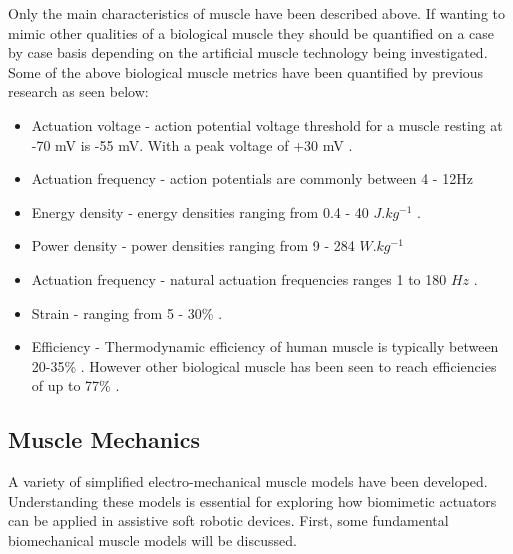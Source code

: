 Only the main characteristics of muscle have been described above. If wanting to mimic other qualities of a biological muscle they should be quantified on a case by case basis depending on the artificial muscle technology being investigated. Some of the above biological muscle metrics have been quantified by previous research as seen below:
\begin{itemize}
	\item Actuation voltage - action potential voltage threshold for a muscle resting at -70 mV is -55 mV. With a peak voltage of +30 mV \cite{Filatov2005,Schmidt-Nielsen2002}.
	\item Actuation frequency - action potentials are commonly between 4 - 12Hz \citep{Popovic2004}
    \item Energy density - energy densities ranging from 0.4 - 40 $J.kg^{-1}$ \citep{Alexander1977}.
    \item Power density - power densities ranging from 9 - 284 $W.kg^{-1}$ \citep{Full2004}
    \item Actuation frequency - natural actuation frequencies ranges 1 to 180 $Hz$ \citep{Full2004}.
    \item Strain - ranging from 5 - 30\% \citep{Duduta2019}.
    \item Efficiency - Thermodynamic efficiency of human muscle is typically between 20-35\% \citep{Smith2005}. However other biological muscle has been seen to reach efficiencies of up to 77\% \citep{Smith2005}.
\end{itemize}
    

\subsection{Muscle Mechanics}
A variety of simplified electro-mechanical muscle models have been developed. Understanding these models is essential for exploring how biomimetic actuators can be applied in assistive soft robotic devices. First, some fundamental biomechanical muscle models will be discussed.

